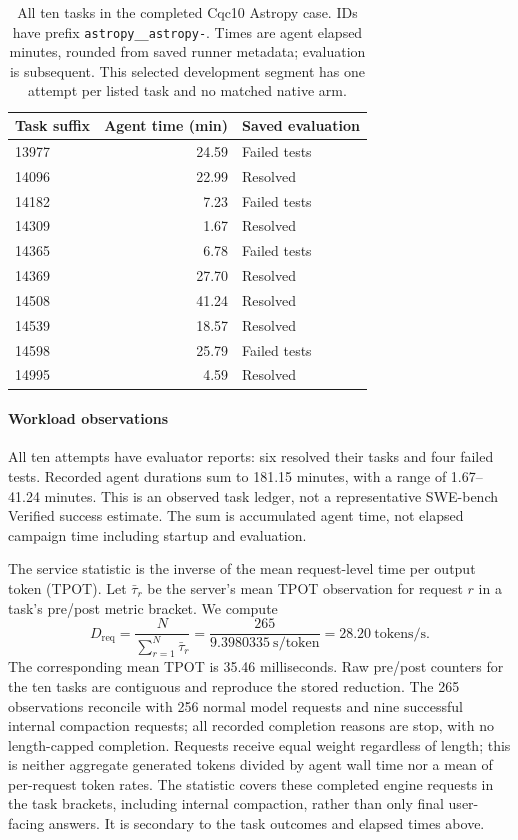 \begin{table}[t]
\caption{All ten tasks in the completed Cqc10 Astropy case. IDs have prefix \texttt{astropy\_\_astropy-}. Times are agent elapsed minutes, rounded from saved runner metadata; evaluation is subsequent. This selected development segment has one attempt per listed task and no matched native arm.}
\label{tab:swe-tasks}
\centering\small
\begin{tabular}{@{}lrl@{}}
\toprule
Task suffix & Agent time (min) & Saved evaluation \\
\midrule
13977 & 24.59 & Failed tests \\
14096 & 22.99 & Resolved \\
14182 & 7.23 & Failed tests \\
14309 & 1.67 & Resolved \\
14365 & 6.78 & Failed tests \\
14369 & 27.70 & Resolved \\
14508 & 41.24 & Resolved \\
14539 & 18.57 & Resolved \\
14598 & 25.79 & Failed tests \\
14995 & 4.59 & Resolved \\
\bottomrule
\end{tabular}
\end{table}

\paragraph{Workload observations}
All ten attempts have evaluator reports: six resolved their tasks and four failed tests. Recorded agent durations sum to 181.15 minutes, with a range of 1.67--41.24 minutes. This is an observed task ledger, not a representative SWE-bench Verified success estimate. The sum is accumulated agent time, not elapsed campaign time including startup and evaluation.

The service statistic is the inverse of the mean request-level time per output token (TPOT). Let $\bar\tau_r$ be the server's mean TPOT observation for request $r$ in a task's pre/post metric bracket. We compute
\begin{equation}
 D_{\mathrm{req}} = \frac{N}{\sum_{r=1}^{N}\bar\tau_r}
 = \frac{265}{9.3980335\ \mathrm{s/token}}
 = 28.20\ \mathrm{tokens/s}.
\end{equation}
The corresponding mean TPOT is 35.46 milliseconds. Raw pre/post counters for the ten tasks are contiguous and reproduce the stored reduction. The 265 observations reconcile with 256 normal model requests and nine successful internal compaction requests; all recorded completion reasons are stop, with no length-capped completion. Requests receive equal weight regardless of length; this is neither aggregate generated tokens divided by agent wall time nor a mean of per-request token rates. The statistic covers these completed engine requests in the task brackets, including internal compaction, rather than only final user-facing answers. It is secondary to the task outcomes and elapsed times above.

